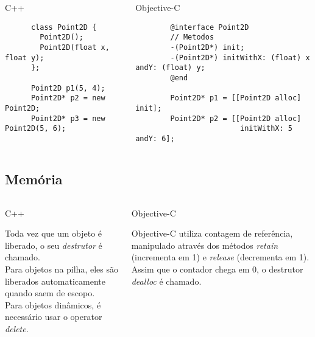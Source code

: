 \documentclass[brazil]{beamer}
\begin{document}
\begin{frame}[fragile]
  \begin{columns}
    \begin{column}{.5\textwidth}
      \begin{center}
        C++
      \end{center}
      \lstset{language=C++,basicstyle=\tiny}
      \begin{lstlisting}
      class Point2D {
        Point2D();
        Point2D(float x, float y);
      };
      
      Point2D p1(5, 4);
      Point2D* p2 = new Point2D;
      Point2D* p3 = new Point2D(5, 6);
      \end{lstlisting}
    \end{column}
    \begin{column}{.5\textwidth}
      \begin{center}
        Objective-C
      \end{center}
      \lstset{language=C++,basicstyle=\tiny}
      \begin{lstlisting}
        @interface Point2D
        // Metodos
        -(Point2D*) init;
        -(Point2D*) initWithX: (float) x andY: (float) y;
        @end
        
        Point2D* p1 = [[Point2D alloc] init];
        Point2D* p2 = [[Point2D alloc] 
                        initWithX: 5 andY: 6];
      \end{lstlisting}
    \end{column}
  \end{columns}
\end{frame}

\subsection{Memória}
\begin{frame}
  \begin{columns}
    \begin{column}{.55\textwidth}
        \begin{center}
            C++
        \end{center}
        Toda vez que um objeto é liberado, o seu \textit{destrutor} é chamado. \\
        Para objetos na pilha, eles são liberados automaticamente quando saem de escopo. \\
        Para objetos dinâmicos, é necessário usar o operator \textit{delete}.
    \end{column}
    \begin{column}{.55\textwidth}
        \begin{center}
            Objective-C
        \end{center}

        Objective-C utiliza contagem de referência, manipulado através dos métodos \textit{retain} 
        (incrementa em 1) e \textit{release} (decrementa em 1). \\
        Assim que o contador chega em 0, o destrutor \textit{dealloc} é chamado.
    \end{column}
  \end{columns}
\end{frame}
\end{document}
